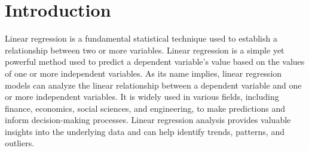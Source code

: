 \section{Introduction}

Linear regression is a fundamental statistical technique used to establish a relationship between two or more variables. Linear regression is a simple yet powerful method used to predict a dependent variable's value based on the values of one or more independent variables. As its name implies, linear regression models can analyze the linear relationship between a dependent variable and one or more independent variables. It is widely used in various fields, including finance, economics, social sciences, and engineering, to make predictions and inform decision-making processes. Linear regression analysis provides valuable insights into the underlying data and can help identify trends, patterns, and outliers.